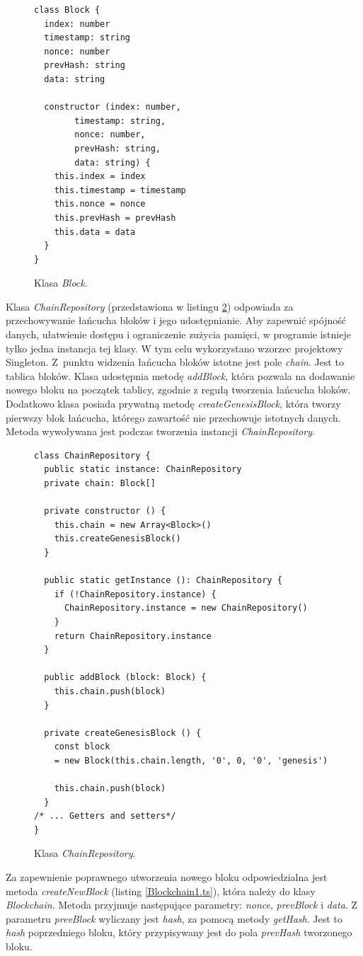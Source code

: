 \documentclass[a4paper,12pt]{book}
\begin{document}
\newpage

\begin{figure}  
  \centering
\begin{lstlisting}[style=ES6]
class Block {
  index: number
  timestamp: string
  nonce: number
  prevHash: string
  data: string

  constructor (index: number,
 		timestamp: string,
 		nonce: number,
 		prevHash: string,
	 	data: string) {
    this.index = index
    this.timestamp = timestamp
    this.nonce = nonce
    this.prevHash = prevHash
    this.data = data
  }
}
\end{lstlisting}
\caption{Klasa \textit{Block}.}
\label{Block.ts}
\end{figure}
Klasa \textit{ChainRepository} (przedstawiona w listingu \ref{ChainRepository.ts}) odpowiada za przechowywanie łańcucha bloków i jego udostępnianie. Aby zapewnić spójność danych, ułatwienie dostępu i ograniczenie zużycia pamięci, w programie istnieje tylko jedna instancja tej klasy. W tym celu wykorzystano wzorzec projektowy Singleton. Z~punktu widzenia łańcucha bloków istotne jest pole \textit{chain}. Jest to tablica bloków. Klasa udostępnia metodę \textit{addBlock}, która pozwala na dodawanie nowego bloku na początek tablicy, zgodnie z regułą tworzenia łańcucha bloków. Dodatkowo klasa posiada prywatną metodę \textit{createGenesisBlock}, która tworzy pierwszy blok łańcucha, którego zawartość nie przechowuje istotnych danych. Metoda wywoływana jest podczas tworzenia instancji \textit{ChainRepository}.

\newpage

\begin{figure}  
  \centering
\begin{lstlisting}[style=ES6]
class ChainRepository {
  public static instance: ChainRepository
  private chain: Block[]

  private constructor () {
    this.chain = new Array<Block>()
    this.createGenesisBlock()
  }

  public static getInstance (): ChainRepository {
    if (!ChainRepository.instance) {
      ChainRepository.instance = new ChainRepository()
    }
    return ChainRepository.instance
  }

  public addBlock (block: Block) {
    this.chain.push(block)
  }

  private createGenesisBlock () {
    const block 
	= new Block(this.chain.length, '0', 0, '0', 'genesis')

    this.chain.push(block)
  }
/* ... Getters and setters*/
}
\end{lstlisting}
\caption{Klasa \textit{ChainRepository}.}
\label{ChainRepository.ts}
\end{figure}
Za zapewnienie poprawnego utworzenia nowego bloku odpowiedzialna jest metoda \textit{createNewBlock} (listing \ref{Blockchain1.ts}), która należy do klasy \textit{Blockchain}. Metoda przyjmuje następujące parametry: \textit{nonce}, \textit{prevBlock} i \textit{data}. Z parametru \textit{prevBlock} wyliczany jest \textit{hash}, za pomocą metody \textit{getHash}. Jest to \textit{hash} poprzedniego bloku, który przypisywany jest do pola \textit{prevHash} tworzonego bloku.
\end{document}
